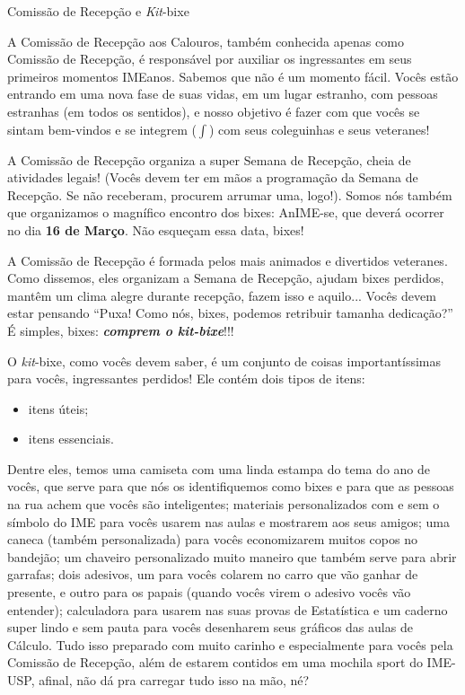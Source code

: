 \begin{secao}{Comissão de Recepção e \textit{Kit}-bixe}

A Comissão de Recepção aos Calouros, também conhecida apenas como Comissão de 
Recepção, é responsável por auxiliar os ingressantes em seus primeiros momentos 
IMEanos. Sabemos que não é um momento fácil. Vocês estão entrando em uma nova fase 
de suas vidas, em um lugar estranho, com pessoas estranhas (em todos os sentidos),
e nosso objetivo é fazer com que vocês se sintam bem-vindos e se integrem
($\int$) com seus coleguinhas e seus veteranes!

A Comissão de Recepção organiza a super Semana de Recepção, cheia de atividades
legais! (Vocês devem ter em mãos a programação da Semana de Recepção. 
Se não receberam, procurem arrumar uma, logo!).
Somos nós também que organizamos o magnífico encontro dos bixes: AnIME-se, que 
deverá ocorrer no dia \textbf{16 de Março}. Não esqueçam essa data, bixes! %

A Comissão de Recepção é formada pelos mais animados e divertidos veteranes. Como
dissemos, eles organizam a Semana de Recepção, ajudam bixes perdidos, mantêm um clima
alegre durante recepção, fazem isso e aquilo...
Vocês devem estar pensando ``Puxa! Como nós, bixes, podemos retribuir
tamanha dedicação?'' É simples, bixes: {\bf\em comprem o \textit{kit}-bixe}!!!

O \textit{kit}-bixe, como vocês devem saber, é um conjunto de coisas
importantíssimas para vocês, ingressantes perdidos! Ele contém dois tipos de
itens:
\begin{itemize}
\item itens úteis;
\item itens essenciais.
\end{itemize} %
Dentre eles, temos uma camiseta com uma linda estampa do tema do ano de vocês,
que serve para que nós os identifiquemos como bixes e para que as pessoas na 
rua achem que vocês são inteligentes; materiais personalizados com e sem o símbolo do IME para 
vocês usarem nas aulas e mostrarem aos seus amigos; uma caneca (também personalizada) 
para vocês economizarem muitos copos no bandejão; um chaveiro personalizado muito 
maneiro que também serve para abrir garrafas;
dois adesivos, um para vocês colarem no carro que vão ganhar de presente, e outro
para os papais (quando vocês virem o adesivo vocês vão entender); calculadora para 
usarem nas suas provas de Estatística e um caderno super
lindo e sem pauta para vocês desenharem seus gráficos das aulas de Cálculo. Tudo
isso preparado com muito carinho e especialmente para vocês pela Comissão de Recepção,
além de estarem contidos em uma mochila sport do IME-USP, afinal, não dá pra
carregar tudo isso na mão, né?


\end{secao}
